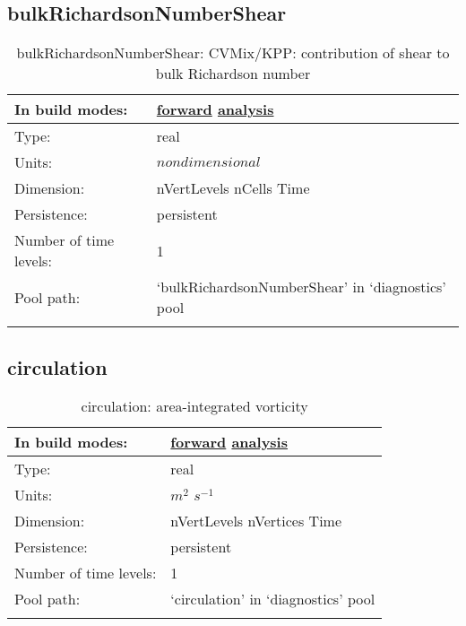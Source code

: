 \subsection[bulkRichardsonNumberShear]{bulkRichardsonNumberShear}
\label{subsec:var_sec_diagnostics_bulkRichardsonNumberShear}
\begin{center}
\begin{longtable}{| p{2.0in} | p{4.0in} |}
        \hline 
        In build modes: & \hyperref[subsec:forward_var_tab_diagnostics]{forward} \hyperref[subsec:analysis_var_tab_diagnostics]{analysis} \\
        \hline 
        Type: & real \\
        \hline 
        Units: & $nondimensional$ \\
        \hline 
        Dimension: & nVertLevels nCells Time \\
        \hline 
        Persistence: & persistent \\
        \hline 
        Number of time levels: & 1 \\
        \hline 
            Pool path: & `bulkRichardsonNumberShear' in `diagnostics' pool \\
		 \hline 
    \caption{bulkRichardsonNumberShear: CVMix/KPP: contribution of shear to bulk Richardson number}
\end{longtable}
\end{center}
\subsection[circulation]{circulation}
\label{subsec:var_sec_diagnostics_circulation}
\begin{center}
\begin{longtable}{| p{2.0in} | p{4.0in} |}
        \hline 
        In build modes: & \hyperref[subsec:forward_var_tab_diagnostics]{forward} \hyperref[subsec:analysis_var_tab_diagnostics]{analysis} \\
        \hline 
        Type: & real \\
        \hline 
        Units: & $m^2$ $s^{-1}$ \\
        \hline 
        Dimension: & nVertLevels nVertices Time \\
        \hline 
        Persistence: & persistent \\
        \hline 
        Number of time levels: & 1 \\
        \hline 
            Pool path: & `circulation' in `diagnostics' pool \\
		 \hline 
    \caption{circulation: area-integrated vorticity}
\end{longtable}
\end{center}

